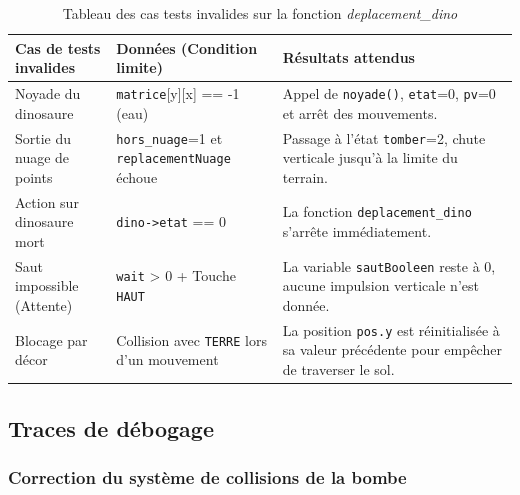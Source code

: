\documentclass[11pt,a4paper]{article}
\begin{document}
\newpage
\begin{table}[ht]
    \small
    \centering
    \begin{tabularx}{\textwidth}{|
    >{\centering\arraybackslash}p{3.2cm}|
    >{\centering\arraybackslash}p{4cm}|
    >{\centering\arraybackslash}X|} \hline
        \textbf{Cas de tests invalides} & \textbf{Données (Condition limite)} & \textbf{Résultats attendus} \\ \hline
        Noyade du dinosaure & \texttt{matrice}[y][x] == -1 (eau) & Appel de \texttt{noyade()}, \texttt{etat}=0, \texttt{pv}=0 et arrêt des mouvements. \\ \hline
        Sortie du nuage de points & \texttt{hors\_nuage}=1 et \texttt{replacementNuage} échoue & Passage à l'état \texttt{tomber}=2, chute verticale jusqu'à la limite du terrain. \\ \hline
        Action sur dinosaure mort & \texttt{dino->etat} == 0 & La fonction \texttt{deplacement\_dino} s'arrête immédiatement. \\ \hline
        Saut impossible (Attente) & \texttt{wait} > 0 + Touche \texttt{HAUT} & La variable \texttt{sautBooleen} reste à 0, aucune impulsion verticale n'est donnée. \\ \hline
        Blocage par décor & Collision avec \texttt{TERRE} lors d'un mouvement & La position \texttt{pos.y} est réinitialisée à sa valeur précédente pour empêcher de traverser le sol. \\ \hline
    \end{tabularx}
    \caption{Tableau des cas tests invalides sur la fonction \textit{deplacement\_dino}}
    \label{tab_cas_invalides_deplacements}
\end{table}

\newpage
\subsection{Traces de débogage}
\subsubsection{Correction du système de collisions de la bombe}
\end{document}
